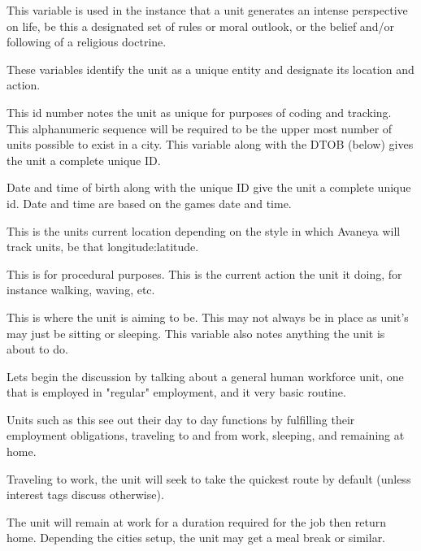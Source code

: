 This variable is used in the instance that a unit generates an intense perspective on life, be this a designated set of rules or moral outlook, or the belief and/or following of a religious doctrine.



These variables identify the unit as a unique entity and designate its location and action.

This id number notes the unit as unique for purposes of coding and tracking. This alphanumeric sequence will be required to be the upper most number of units possible to exist in a city. This variable along with the DTOB (below) gives the unit a complete unique ID.

Date and time of birth along with the unique ID give the unit a complete unique id. Date and time are based on the games date and time.

This is the units current location depending on the style in which Avaneya will track units, be that longitude:latitude.

This is for procedural purposes. This is the current action the unit it doing, for instance walking, waving, etc.

This is where the unit is aiming to be. This may not always be in place as unit's may just be sitting or sleeping. This variable also notes anything the unit is about to do.











Lets begin the discussion by talking about a general human workforce unit, one that is employed in "regular" employment, and it very basic routine.

Units such as this see out their day to day functions by fulfilling their employment obligations, traveling to and from work, sleeping, and remaining at home.

Traveling to work, the unit will seek to take the quickest route by default (unless interest tags discuss otherwise).

The unit will remain at work for a duration required for the job then return home. Depending the cities setup, the unit may get a meal break or similar.

